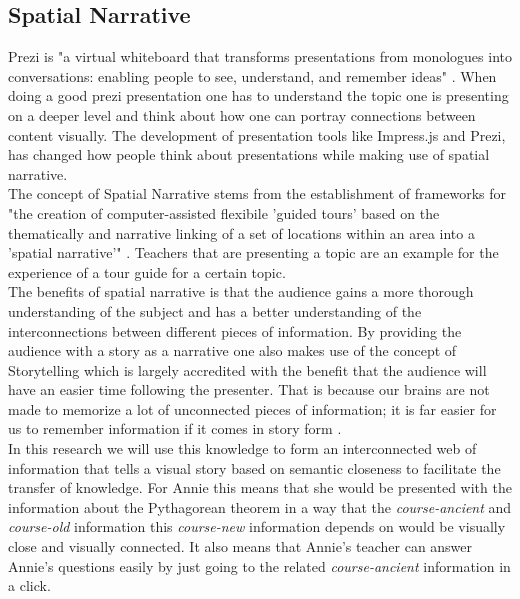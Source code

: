 \documentclass[twoside]{article}
\begin{document}
\subsection{Spatial Narrative}
\label{sec:spatialnarrative}

Prezi is "a virtual whiteboard that transforms presentations from monologues into conversations: enabling people to see, understand, and remember ideas" \cite{Prezi:npentrel14}. When doing a good prezi presentation one has to understand the topic one is presenting on a deeper level and think about how one can portray connections between content visually. The development of presentation tools like Impress.js and Prezi, has changed how people think about presentations while making use of spatial narrative.\\

The concept of Spatial Narrative stems from the establishment of frameworks for "the creation of computer-assisted flexibile 'guided tours' based on the thematically and narrative linking of a set of locations within an area into a 'spatial narrative'" \cite{SpatialNarratives:npentrel14}. Teachers that are presenting a topic are an example for the experience of a tour guide for a certain topic.\\

The benefits of spatial narrative is that the audience gains a more thorough understanding of the subject and has a better understanding of the interconnections between different pieces of information. By providing the audience with a story as a narrative one also makes use of the concept of Storytelling which is largely accredited with the benefit that the audience will have an easier time following the presenter. That is because our brains are not made to memorize a lot of unconnected pieces of information; it is far easier for us to remember information if it comes in story form \cite{Storytelling:npentrel14}.\\

In this research we will use this knowledge to form an interconnected web of information that tells a visual story based on semantic closeness to facilitate the transfer of knowledge. For Annie this means that she would be presented with the information about the Pythagorean theorem in a way that the \textit{course-ancient} and \textit{course-old} information this \textit{course-new} information depends on would be visually close and visually connected. It also means that Annie's teacher can answer Annie's questions easily by just going to the related \textit{course-ancient} information in a click.\\
\end{document}
